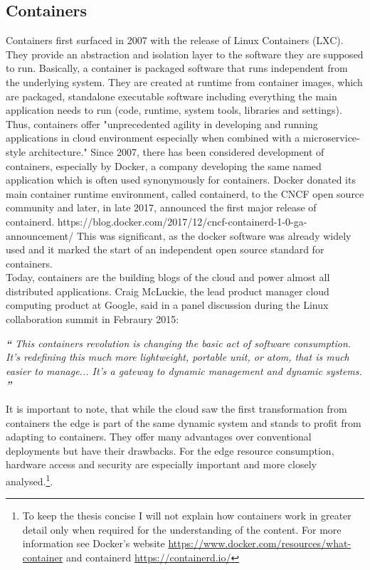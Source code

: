 \subsection{Containers} \label{containers}
Containers first surfaced in 2007 with the release of Linux Containers (LXC). They provide an abstraction and isolation layer to the software they are supposed to run. Basically, a container is packaged software that runs independent from the underlying system. They are created at runtime from container images, which are packaged, standalone executable software including everything the main application needs to run (code, runtime, system tools, libraries and settings)\cite{containerDefinition:online}. Thus, containers offer
"unprecedented agility in developing and running applications in cloud environment especially when combined with a microservice-style architecture."\cite{microserviceContainers} Since 2007, there has been considered development of containers, especially by Docker, a company developing the same named application which is often used synonymously for containers. Docker donated its main container runtime environment, called containerd, to the CNCF open source community and later, in late 2017, announced the first major release of containerd. https://blog.docker.com/2017/12/cncf-containerd-1-0-ga-announcement/ This was significant, as the docker software was already widely used and it marked the start of an independent open source standard for containers.\\
Today, containers are the building blogs of the cloud and power almost all distributed applications. Craig McLuckie, the lead product manager cloud computing product at Google, said in a panel discussion during the Linux collaboration summit in Febraury 2015:
\begin{displayquote}
\textit{\textbf{\large{``}}}
\textit{This containers revolution is changing the basic act of software consumption. It’s redefining this much more lightweight, portable unit, or atom, that is much easier to manage... It’s a gateway to dynamic management and dynamic systems.}
\textit{\textbf{\large{''}}}
\end{displayquote}
It is important to note, that while the cloud saw the first transformation from containers the edge is part of the same dynamic system and stands to profit from adapting to containers. They offer many advantages over conventional deployments but have their drawbacks. For the edge resource consumption, hardware access and security are especially important and more closely analysed.\footnote{To keep the thesis concise I will not explain how containers work in greater detail only when required for the understanding of the content. For more information see Docker's website  \url{https://www.docker.com/resources/what-container} and containerd \url{https://containerd.io/}}.

